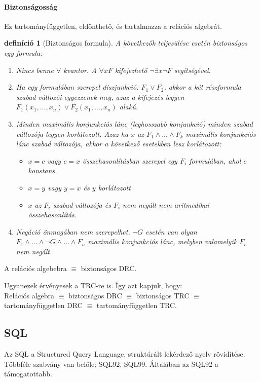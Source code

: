 \documentclass[fleqn,10pt,a4paper]{article}
\theoremstyle{magyar}
\newtheorem{de}{definíció}[section]
\begin{document}
  \paragraph{Biztonságosság} Ez tartományfüggetlen, eldönthető, és tartalmazza a relációs algebrát.
  \begin{de}[Biztonságos formula] A következők teljesülése esetén biztonságos egy formula:
    \begin{enumerate}
    \item Nincs benne $\forall$ kvantor. A $\forall x F$ kifejezhető $\lnot\exists x\lnot F$ segítségével.
    \item Ha egy formulában szerepel diszjunkció: $F_1 \lor F_2$, akkor a két részformula szabad változói egyezzenek meg,
      azaz a kifejezés legyen $F_1(x_1,\ldots,x_n)\lor F_2(x_1,\ldots,x_n)$ alakú.
    \item Minden \emph{maximális konjunkciós lánc} (leghosszabb konjunkció) minden szabad változója legyen
      korlátozott. Azaz ha $x$ az $F_1\land\ldots\land F_k$ maximális konjunkciós lánc szabad változója, akkor a következő
      esetekben lesz korlátozott:
      \begin{itemize}
      \item $x=c$ vagy $c=x$ összehasonlításban szerepel egy $F_i$ formulában, ahol $c$ konstans.
      \item $x=y$ vagy $y=x$ és $y$ korlátozott
      \item $x$ az $F_i$ szabad változója és $F_i$ nem negált nem aritmedikai összehasonlítás.
      \end{itemize}
    \item Negáció önmagában nem szerepelhet. $\lnot G$ esetén van olyan $F_1\land\ldots\land\lnot G\land\ldots\land F_n$
      maximális konjunkciós lánc, melyben valamelyik $F_i$ nem negált.
    \end{enumerate}
  \end{de}

  A relációs algebebra $\equiv$ biztonságos DRC.
  
  Ugyanezek érvényesek a TRC-re is. Így azt kapjuk, hogy:\\
  Relációs algebra $\equiv$ biztonságos DRC $\equiv$ biztonságos TRC $\equiv$ tartományfüggetlen DRC $\equiv$
  tartományfüggetlen TRC.
  
  \subsection{SQL}
  Az SQL a Structured Query Language, struktúrált lekérdező nyelv rövidítése. Többféle szabvány van belőle: SQL92,
  SQL99. Általában az SQL92 a támogatottabb.
\end{document}
